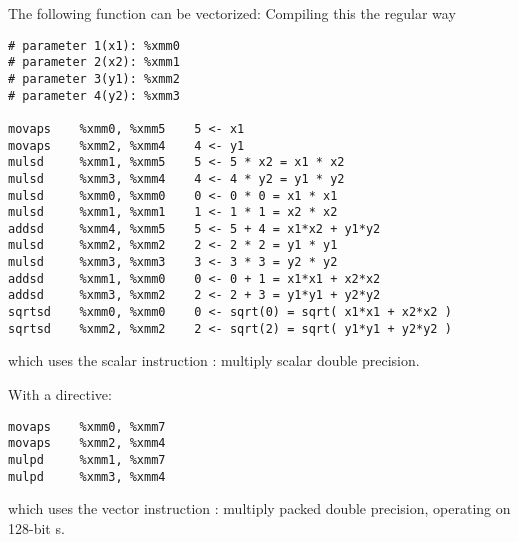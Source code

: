 The following function can be vectorized:
%
%
Compiling this the regular way
\begin{verbatim}
# parameter 1(x1): %xmm0
# parameter 2(x2): %xmm1
# parameter 3(y1): %xmm2
# parameter 4(y2): %xmm3

movaps    %xmm0, %xmm5    5 <- x1
movaps    %xmm2, %xmm4    4 <- y1
mulsd     %xmm1, %xmm5    5 <- 5 * x2 = x1 * x2
mulsd     %xmm3, %xmm4    4 <- 4 * y2 = y1 * y2
mulsd     %xmm0, %xmm0    0 <- 0 * 0 = x1 * x1
mulsd     %xmm1, %xmm1    1 <- 1 * 1 = x2 * x2
addsd     %xmm4, %xmm5    5 <- 5 + 4 = x1*x2 + y1*y2
mulsd     %xmm2, %xmm2    2 <- 2 * 2 = y1 * y1
mulsd     %xmm3, %xmm3    3 <- 3 * 3 = y2 * y2
addsd     %xmm1, %xmm0    0 <- 0 + 1 = x1*x1 + x2*x2
addsd     %xmm3, %xmm2    2 <- 2 + 3 = y1*y1 + y2*y2
sqrtsd    %xmm0, %xmm0    0 <- sqrt(0) = sqrt( x1*x1 + x2*x2 )
sqrtsd    %xmm2, %xmm2    2 <- sqrt(2) = sqrt( y1*y1 + y2*y2 )
\end{verbatim}
which uses the scalar instruction : multiply scalar double precision.

With a  directive:
\begin{verbatim}
movaps    %xmm0, %xmm7
movaps    %xmm2, %xmm4
mulpd     %xmm1, %xmm7
mulpd     %xmm3, %xmm4
\end{verbatim}
which uses the vector instruction : multiply packed
double precision, operating on 128-bit s.


